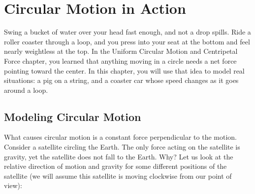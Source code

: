 \chapter{Circular Motion in Action}

Swing a bucket of water over your head fast enough, and not a drop spills. Ride a roller coaster through a loop,
and you press into your seat at the bottom and feel nearly weightless at the top. In the Uniform Circular Motion
and Centripetal Force chapter, you learned that anything moving in a circle needs a net force pointing toward the
center. In this chapter, you will use that idea to model real situations: a pig on a string, and a coaster car
whose speed changes as it goes around a loop.

\section{Modeling Circular Motion}
What causes circular motion is a constant force perpendicular to the motion. Consider a satellite circling the Earth. The only force acting on the satellite is gravity, yet the satellite does not fall to the Earth. Why? Let us look at the relative direction of motion and gravity for some different positions of the satellite (we will assume this satellite is moving clockwise from our point of view):

